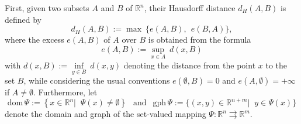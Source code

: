 %
%
First, given two subsets $A$ and $B$ of $\mathbb{R}^{n}$, their Hausdorff
distance $d_{H}(A,B)$ is defined by
\[
d_{H}(A,B):=\max~\{e(A,B), \;\, e(B,A)\},
\]
where the excess $e(A,B)$ of $A$ over $B$ is obtained from the formula%
\[
e(A,B):=\underset{x\in A}{\sup}~d(x,B)
\]
with $d(x,B):=\underset{y\in B}{\inf}~d(x,y)$ denoting the distance from the point $x$ to the set $B$, while considering the usual conventions
 $e(\emptyset,B)=0$ and $e(A,\emptyset)=+\infty$ if
$A\neq\emptyset$. Furthermore, let
\[
\mathrm{dom}\,\Psi:=\left\{x\in\mathbb{R}^{n}|\;\;\Psi(x)\neq\emptyset \right\} \;\, \mbox{ and }\;\, \mbox{gph}\,\Psi :=\{(x,y)\in\mathbb{R}^{n+m}|\;\;y\in\Psi(x)\}
\]
denote the domain  and graph of the set-valued mapping $\Psi :\mathbb{R}^{n}\rightrightarrows\mathbb{R}^{m}$. %

